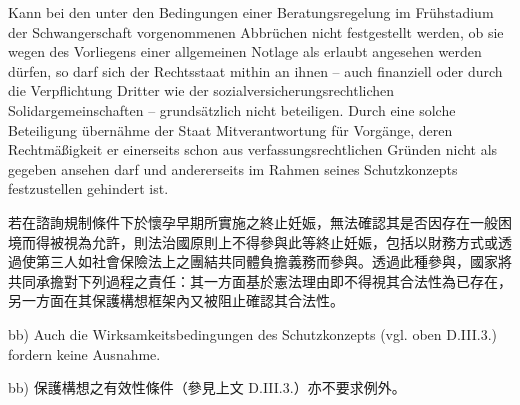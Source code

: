\documentclass[12pt]{article}
\begin{document}
\begin{sourcepara}[title={原文E.205}]
Kann bei den unter den Bedingungen einer Beratungsregelung im Frühstadium der Schwangerschaft vorgenommenen Abbrüchen nicht festgestellt werden, ob sie wegen des Vorliegens einer allgemeinen Notlage als erlaubt angesehen werden dürfen, so darf sich der Rechtsstaat mithin an ihnen -- auch finanziell oder durch die Verpflichtung Dritter wie der sozialversicherungsrechtlichen Solidargemeinschaften -- grundsätzlich nicht beteiligen. Durch eine solche Beteiligung übernähme der Staat Mitverantwortung für Vorgänge, deren Rechtmäßigkeit er einerseits schon aus verfassungsrechtlichen Gründen nicht als gegeben ansehen darf und andererseits im Rahmen seines Schutzkonzepts festzustellen gehindert ist.
\end{sourcepara}
\begin{transpara}
若在諮詢規制條件下於懷孕早期所實施之終止妊娠，無法確認其是否因存在一般困境而得被視為允許，則法治國原則上不得參與此等終止妊娠，包括以財務方式或透過使第三人如社會保險法上之團結共同體負擔義務而參與。透過此種參與，國家將共同承擔對下列過程之責任：其一方面基於憲法理由即不得視其合法性為已存在，另一方面在其保護構想框架內又被阻止確認其合法性。
\end{transpara}

\begin{sourcepara}[title={原文E.206}]
bb) Auch die Wirksamkeitsbedingungen des Schutzkonzepts (vgl. oben D.III.3.) fordern keine Ausnahme.
\end{sourcepara}
\begin{transpara}
bb) 保護構想之有效性條件（參見上文 D.III.3.）亦不要求例外。
\end{transpara}
\end{document}
